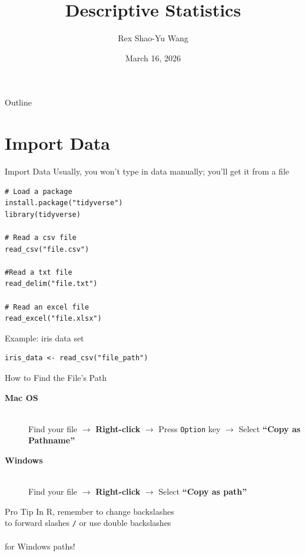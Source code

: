 \documentclass{beamer}					%
\title{Descriptive Statistics}	%
\author{Rex Shao-Yu Wang}								%
\institute{Department of Agronomy, National Taiwan University}					%
\date{March 16, 2026}									%
\begin{document}
\begin{frame}
  \titlepage
\end{frame}

\begin{frame}{Outline}
  \tableofcontents
\end{frame}

\section{Import Data}
\begin{frame}[fragile]{Import Data}
Usually, you won't type in data manually; you'll get it from a file
\begin{lstlisting}
# Load a package
install.package("tidyverse")
library(tidyverse)

# Read a csv file
read_csv("file.csv")

#Read a txt file
read_delim("file.txt")

# Read an excel file
read_excel("file.xlsx") 

\end{lstlisting}

Example: iris data set
\begin{lstlisting}
iris_data <- read_csv("file_path")
\end{lstlisting}
\end{frame}

\begin{frame}{How to Find the File's Path}
    \begin{description}
        \item[\textbf{Mac OS}] \hfill \\
        Find your file $\rightarrow$ \textbf{Right-click} $\rightarrow$ Press \texttt{Option} key $\rightarrow$ Select \textbf{“Copy as Pathname”}
        
        \vspace{1.5em} %
        
        \item[\textbf{Windows}] \hfill \\
        Find your file $\rightarrow$ \textbf{Right-click} $\rightarrow$ Select \textbf{“Copy as path”} \\
    \end{description}

    \vspace{2em}
    
    \begin{exampleblock}{Pro Tip}
        In R, remember to change backslashes \texttt{\\} to forward slashes \texttt{/} or use double backslashes \texttt{\\\\} for Windows paths!
    \end{exampleblock}
\end{frame}
\end{document}
